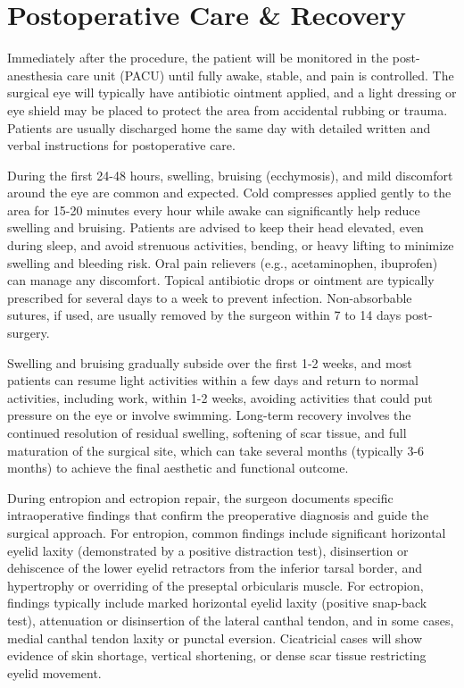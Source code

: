 \section*{Postoperative Care \& Recovery}
Immediately after the procedure, the patient will be monitored in the post-anesthesia care unit (PACU) until fully awake, stable, and pain is controlled. The surgical eye will typically have antibiotic ointment applied, and a light dressing or eye shield may be placed to protect the area from accidental rubbing or trauma. Patients are usually discharged home the same day with detailed written and verbal instructions for postoperative care.

During the first 24-48 hours, swelling, bruising (ecchymosis), and mild discomfort around the eye are common and expected. Cold compresses applied gently to the area for 15-20 minutes every hour while awake can significantly help reduce swelling and bruising. Patients are advised to keep their head elevated, even during sleep, and avoid strenuous activities, bending, or heavy lifting to minimize swelling and bleeding risk. Oral pain relievers (e.g., acetaminophen, ibuprofen) can manage any discomfort. Topical antibiotic drops or ointment are typically prescribed for several days to a week to prevent infection. Non-absorbable sutures, if used, are usually removed by the surgeon within 7 to 14 days post-surgery. 

Swelling and bruising gradually subside over the first 1-2 weeks, and most patients can resume light activities within a few days and return to normal activities, including work, within 1-2 weeks, avoiding activities that could put pressure on the eye or involve swimming. Long-term recovery involves the continued resolution of residual swelling, softening of scar tissue, and full maturation of the surgical site, which can take several months (typically 3-6 months) to achieve the final aesthetic and functional outcome.

During entropion and ectropion repair, the surgeon documents specific intraoperative findings that confirm the preoperative diagnosis and guide the surgical approach. For entropion, common findings include significant horizontal eyelid laxity (demonstrated by a positive distraction test), disinsertion or dehiscence of the lower eyelid retractors from the inferior tarsal border, and hypertrophy or overriding of the preseptal orbicularis muscle. For ectropion, findings typically include marked horizontal eyelid laxity (positive snap-back test), attenuation or disinsertion of the lateral canthal tendon, and in some cases, medial canthal tendon laxity or punctal eversion. Cicatricial cases will show evidence of skin shortage, vertical shortening, or dense scar tissue restricting eyelid movement.

